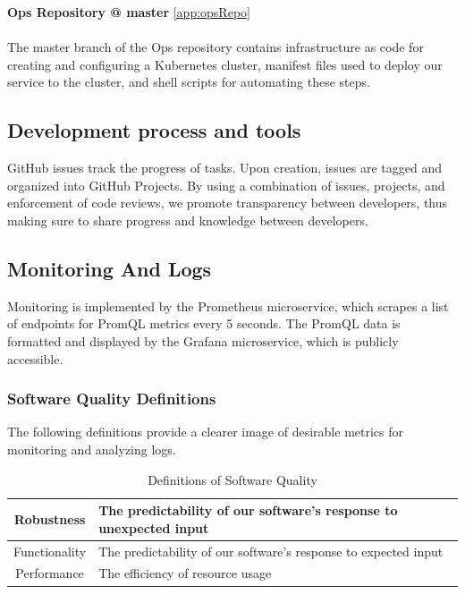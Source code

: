 \textbf{Ops Repository @ master} \ref{app:opsRepo}\\\\
The master branch of the Ops repository contains infrastructure as code for creating and configuring a Kubernetes cluster, manifest files used to deploy our service to the cluster, and shell scripts for automating these steps.

\subsection{Development process and tools}
\label{subsec:process&tools}
GitHub issues track the progress of tasks. Upon creation, issues are tagged and organized into GitHub Projects. By using a combination of issues, projects, and enforcement of code reviews, we promote transparency between developers, thus making sure to share progress and knowledge between developers.

\subsection{Monitoring And Logs}
\label{subsec:monitoring}
Monitoring is implemented by the Prometheus microservice, which scrapes a list of endpoints for PromQL metrics every 5 seconds.
The PromQL data is formatted and displayed by the Grafana microservice, which is publicly accessible.
\subsubsection{Software Quality Definitions}
\label{subsubsec:software_quality_definitions}
The following definitions provide a clearer image of desirable metrics for monitoring \mini and analyzing logs.
\begin{table}[H]
    \centering
    \begin{tabular}{|c|p{6cm}|}\hline
        Robustness & The predictability of our software's response to unexpected input  \\\hline
        Functionality & The predictability of our software's response to expected input \\\hline
        Performance & The efficiency of resource usage \\ \hline
    \end{tabular}
    \caption{Definitions of Software Quality}
    \label{tab:software_quality}
\end{table}

